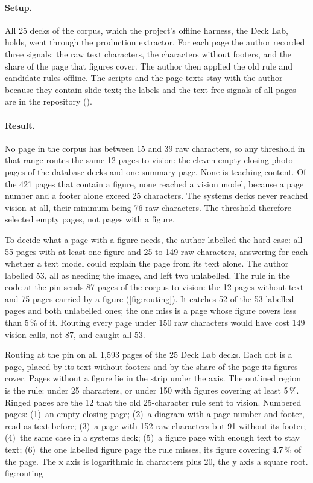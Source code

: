 \paragraph{Setup.} All 25 decks of the corpus, which the project's offline
harness, the Deck Lab, holds, went through the production extractor. For each
page the author recorded three signals: the raw text characters, the
characters without footers, and the share of the page that figures cover. The
author then applied the old rule and candidate rules offline. The scripts and
the page texts stay with the author because they contain slide text; the
labels and the text-free signals of all pages are in the repository
().

\paragraph{Result.} No page in the corpus has between 15 and 39 raw
characters, so any threshold in that range routes the same 12 pages to vision:
the eleven empty closing photo pages of the database decks and one summary
page. None is teaching content. Of the 421 pages that contain a figure, none
reached a vision model, because a page number and a footer alone exceed 25
characters. The systems decks never reached vision at all, their minimum
being 76 raw characters. The threshold therefore selected empty pages, not
pages with a figure.

To decide what a page with a figure needs, the author labelled the hard case:
all 55 pages with at least one figure and 25 to 149 raw characters,
answering for each whether a text model could explain the page from its text
alone. The author labelled 53, all as needing the image, and left two
unlabelled. The rule in the code at the pin sends 87 pages of the corpus to
vision: the 12 pages without text and 75 pages carried by a figure
(\cref{fig:routing}). It catches 52 of the 53 labelled pages and both
unlabelled ones; the one miss is a page whose figure covers less than 5\,\% of
it. Routing every page under 150 raw characters would have cost 149 vision calls,
not 87, and caught all 53.

  {Routing at the pin on all 1{,}593 pages of the 25 Deck Lab decks. Each dot
   is a page, placed by its text without footers and by the share of the page
   its figures cover. Pages without a figure lie in the strip under the axis.
   The outlined region is the rule: under 25 characters, or under 150 with
   figures covering at least 5\,\%. Ringed pages are the 12 that the old
   25-character rule sent to vision. Numbered pages: (1)~an empty closing
   page; (2)~a diagram with a page number and footer, read as text before;
   (3)~a page with 152 raw characters but 91 without its footer; (4)~the same
   case in a systems deck; (5)~a figure page with enough text to stay text;
   (6)~the one labelled figure page the rule misses, its figure covering
   4.7\,\% of the page. The x axis is logarithmic in characters plus 20, the
   y axis a square root.}
  {fig:routing}

